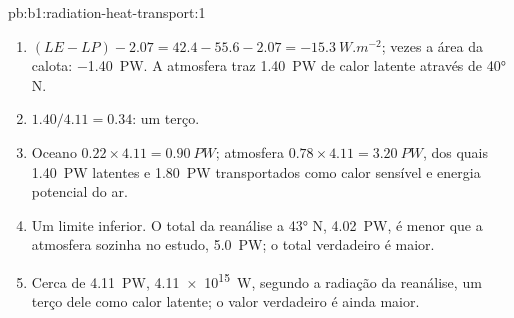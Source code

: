 \begin{solution}{pb:b1:radiation-heat-transport:1}
\begin{enumerate}
  \item $(LE - LP) - 2.07 = 42.4 - 55.6 - 2.07 = \qty{-15.3}{W.m^{-2}}$; vezes a área da calota:
        \qty{-1.40}{PW}. A atmosfera traz \qty{1.40}{PW} de calor latente através de \ang{40} N.
  \item $1.40/4.11 = 0.34$: um terço.
  \item Oceano $0.22 \times 4.11 = \qty{0.90}{PW}$; atmosfera $0.78 \times 4.11 =
        \qty{3.20}{PW}$, dos quais \qty{1.40}{PW} latentes e \qty{1.80}{PW} transportados como calor
        sensível e energia potencial do ar.
  \item Um limite inferior. O total da reanálise a \ang{43} N, \qty{4.02}{PW}, é menor que a
        atmosfera sozinha no estudo, \qty{5.0}{PW}; o total verdadeiro é maior.
  \item Cerca de \qty{4.11}{PW}, \qty{4.11e15}{W}, segundo a radiação da reanálise, um terço dele
        como calor latente; o valor verdadeiro é ainda maior.
        \end{enumerate}
\end{solution}
